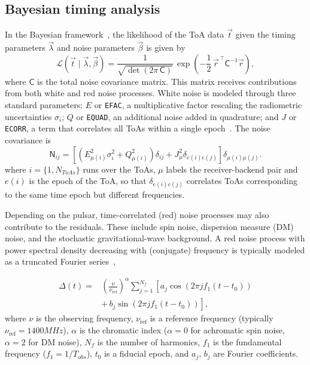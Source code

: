 \documentclass[
    floats,
    floatfix,
    amssymb,
    prd,
    twocolumn,
    superscriptaddress,
    nofootinbib,
    unicode,
    colorlinks=true,
    linktocpage=true
]{revtex4-2}
\begin{document}
\subsection{Bayesian timing analysis}
\label{sec:bayesian_timing}
In the Bayesian framework~\cite{Lentati:2013rla, Susobhanan:2024yef}, the likelihood of
the ToA data $\vec{t}$ given the timing parameters $\vec{\lambda}$ and
noise parameters $\vec{\beta}$ is given by
\begin{equation}
    \mathcal{L}(\vec{t} \mid \vec{\lambda}, \vec{\beta})
    = \frac{1}{\sqrt{\det(2\pi\,\mathsf{C})}}\,
      \exp\!\left(-\frac{1}{2}\,\vec{r}^{\,\top}
      \mathsf{C}^{-1}\vec{r}\right),
\label{eq:likelihood}
\end{equation}
where $\mathsf{C}$ is the total noise covariance matrix. This matrix
receives contributions from both white and red noise processes.
White noise is modeled through three standard parameters: $E$ or \texttt{EFAC},
a multiplicative factor rescaling the radiometric uncertainties $\sigma_i$;
$Q$ or \texttt{EQUAD}, an additional noise added in quadrature; and
$J$ or \texttt{ECORR}, a term that correlates all ToAs within a single
epoch~\cite{Lentati:2013rla, Susobhanan:2024yef}. The noise covariance is
\begin{equation}
    \mathsf{N}_{ij}  =  \left[\left(E_{\mu(i)}^2 \sigma_i^2 + Q_{\mu(i)}^2\right)\delta_{ij}+ J_\mu^2 \delta_{e(i)e(j)}\right]\delta_{\mu(i)\mu(j)}.
    \label{eq:white}
\end{equation}
where $i=\{1,N_{ToAs}\}$ runs over the ToAs, $\mu$ labels the receiver-backend pair and $e(i)$ is the epoch of the ToA, so that $\delta_{e(i)e(j)}$ correlates ToAs corresponding to the same time epoch but different frequencies. 

Depending on the pulsar, time-correlated (red) noise processes may also
contribute to the residuals. These include spin noise, dispersion measure
(DM) noise, and the stochastic gravitational-wave background. A red noise
process with power spectral density decreasing with (conjugate) frequency
is typically modeled as a truncated Fourier series~\cite{Lentati:2013rla},

\begin{equation}
\begin{split}
    \Delta(t) = {} & \left(\frac{\nu}{\nu_\mathrm{ref}}\right)^{\!\alpha}
    \sum_{j=1}^{N_f}
    \left[ a_j \cos\!\left(2\pi j f_1 (t - t_0)\right) \right. \\ %
    & \left. + \, b_j \sin\!\left(2\pi j f_1 (t - t_0)\right) \right], %
\end{split}
\label{eq:red_noise}
\end{equation}
where $\nu$ is the observing frequency, $\nu_\mathrm{ref}$ is a reference
frequency (typically $\nu_\mathrm{ref}=1400 MHz$), $\alpha$ is the chromatic index ($\alpha = 0$ for achromatic
spin noise, $\alpha = 2$ for DM noise), $N_f$ is the number of harmonics,
$f_1$ is the fundamental frequency ($f_1=1/T_{obs}$), $t_0$ is a fiducial epoch, and $a_j$,
$b_j$ are Fourier coefficients.
\end{document}
